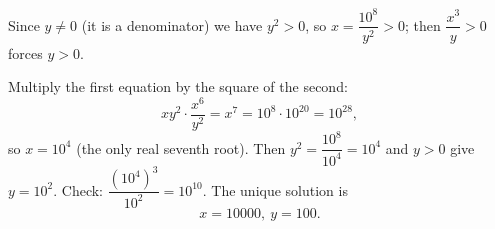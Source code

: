 Since $y\ne0$ (it is a denominator) we have $y^2>0$, so $x=\dfrac{10^8}{y^2}>0$; then $\dfrac{x^3}{y}>0$ forces $y>0$.

Multiply the first equation by the square of the second:
\[
xy^2\cdot\dfrac{x^6}{y^2}=x^7=10^8\cdot10^{20}=10^{28},
\]
so $x=10^4$ (the only real seventh root). Then $y^2=\dfrac{10^8}{10^4}=10^4$ and $y>0$ give $y=10^2$. Check: $\dfrac{(10^4)^3}{10^2}=10^{10}$. The unique solution is
\[
\boxed{x=10000,\ y=100}.
\]

